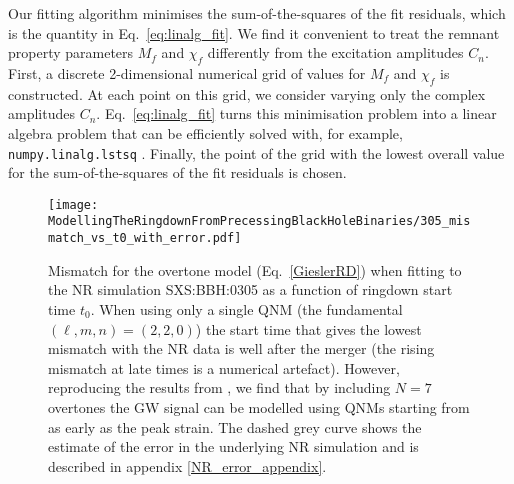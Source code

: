 Our fitting algorithm minimises the sum-of-the-squares of the fit residuals, which is the quantity in Eq.~\ref{eq:linalg_fit}. 
We find it convenient to treat the remnant property parameters $M_f$ and $\chi_f$ differently from the excitation amplitudes $C_n$. 
First, a discrete 2-dimensional numerical grid of values for 
$M_f$ and $\chi_f$ is constructed.
At each point on this grid, we consider varying only the complex amplitudes $C_n$. 
Eq.~\ref{eq:linalg_fit} turns this minimisation problem into a linear algebra problem that can be efficiently solved with, for example, \texttt{numpy.linalg.lstsq} \cite{Harris:2020xlr}.
Finally, the point of the grid with the lowest overall value for the sum-of-the-squares of the fit residuals is chosen.

\begin{figure}[t]
    \centering
    \texttt{[image: ModellingTheRingdownFromPrecessingBlackHoleBinaries/305\_mismatch\_vs\_t0\_with\_error.pdf]}
    \caption[Mismatch as a function of ringdown start time for an overtone model fitted to SXS:BBH:0305]{ 
    Mismatch for the overtone model (Eq.~\ref{GieslerRD}) when fitting to the NR simulation SXS:BBH:0305 as a function of ringdown start time $t_0$. When using only a single QNM (the fundamental $(\ell,m,n)=(2,2,0)$) the start time that gives the lowest mismatch with the NR data is well after the merger (the rising mismatch at late times is a numerical artefact). However, reproducing the results from \cite{Giesler:2019uxc}, we find that by including $N=7$ overtones the GW signal can be modelled using QNMs starting from as early as the peak strain. The dashed grey curve shows the estimate of the error in the underlying NR simulation and is described in appendix \ref{NR_error_appendix}.}
	\label{305_mismatch_vs_t0}
\end{figure}


